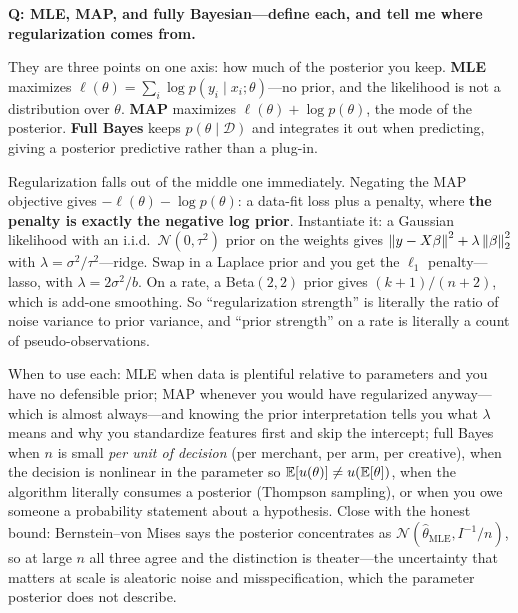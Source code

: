 \begin{interviewq}
\textbf{Q: MLE, MAP, and fully Bayesian---define each, and tell me where regularization comes from.}

 \quad {} \quad \badgefreq{\freqhigh}

\stronganswer

They are three points on one axis: how much of the posterior you keep. \textbf{MLE} maximizes $\ell(\theta) = \sum_i \log p(y_i \mid x_i;\theta)$---no prior, and the likelihood is not a distribution over $\theta$. \textbf{MAP} maximizes $\ell(\theta) + \log p(\theta)$, the mode of the posterior. \textbf{Full Bayes} keeps $p(\theta\mid\mathcal{D})$ and integrates it out when predicting, giving a posterior predictive rather than a plug-in.

Regularization falls out of the middle one immediately. Negating the MAP objective gives $-\ell(\theta) - \log p(\theta)$: a data-fit loss plus a penalty, where \textbf{the penalty is exactly the negative log prior}. Instantiate it: a Gaussian likelihood with an i.i.d.\ $\mathcal{N}(0,\tau^2)$ prior on the weights gives $\left\lVert y-X\beta\right\rVert^2 + \lambda\left\lVert\beta\right\rVert_2^2$ with $\lambda = \sigma^2/\tau^2$---ridge. Swap in a Laplace prior and you get the $\ell_1$ penalty---lasso, with $\lambda = 2\sigma^2/b$. On a rate, a Beta$(2,2)$ prior gives $(k+1)/(n+2)$, which is add-one smoothing. So ``regularization strength'' is literally the ratio of noise variance to prior variance, and ``prior strength'' on a rate is literally a count of pseudo-observations.

When to use each: MLE when data is plentiful relative to parameters and you have no defensible prior; MAP whenever you would have regularized anyway---which is almost always---and knowing the prior interpretation tells you what $\lambda$ means and why you standardize features first and skip the intercept; full Bayes when $n$ is small \textit{per unit of decision} (per merchant, per arm, per creative), when the decision is nonlinear in the parameter so $\operatorname{\mathbb{E}}[u(\theta)] \ne u(\operatorname{\mathbb{E}}[\theta])$, when the algorithm literally consumes a posterior (Thompson sampling), or when you owe someone a probability statement about a hypothesis. Close with the honest bound: Bernstein--von Mises says the posterior concentrates as $\mathcal{N}(\hat\theta_{\text{MLE}}, I^{-1}/n)$, so at large $n$ all three agree and the distinction is theater---the uncertainty that matters at scale is aleatoric noise and misspecification, which the parameter posterior does not describe.


\end{interviewq}
